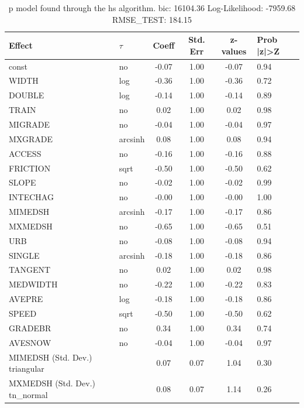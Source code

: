 \begin{table}
	\caption{p model found through the hs algorithm. bic: 16104.36 Log-Likelihood: -7959.68 RMSE_TEST: 184.15}
	\begin{center}
		\begin{tabular}{|l|l|c|c|c|l|}
			\hline
			Effect & $\tau$ & Coeff & Std. Err & z-values & Prob |z|>Z \\
			\hline
			const & no & -0.07 & 1.00 & -0.07 & 0.94 \\
			\hline
			WIDTH & log & -0.36 & 1.00 & -0.36 & 0.72 \\
			\hline
			DOUBLE & log & -0.14 & 1.00 & -0.14 & 0.89 \\
			\hline
			TRAIN & no & 0.02 & 1.00 & 0.02 & 0.98 \\
			\hline
			MIGRADE & no & -0.04 & 1.00 & -0.04 & 0.97 \\
			\hline
			MXGRADE & arcsinh & 0.08 & 1.00 & 0.08 & 0.94 \\
			\hline
			ACCESS & no & -0.16 & 1.00 & -0.16 & 0.88 \\
			\hline
			FRICTION & sqrt & -0.50 & 1.00 & -0.50 & 0.62 \\
			\hline
			SLOPE & no & -0.02 & 1.00 & -0.02 & 0.99 \\
			\hline
			INTECHAG & no & -0.00 & 1.00 & -0.00 & 1.00 \\
			\hline
			MIMEDSH & arcsinh & -0.17 & 1.00 & -0.17 & 0.86 \\
			\hline
			MXMEDSH & no & -0.65 & 1.00 & -0.65 & 0.51 \\
			\hline
			URB & no & -0.08 & 1.00 & -0.08 & 0.94 \\
			\hline
			SINGLE & arcsinh & -0.18 & 1.00 & -0.18 & 0.86 \\
			\hline
			TANGENT & no & 0.02 & 1.00 & 0.02 & 0.98 \\
			\hline
			MEDWIDTH & no & -0.22 & 1.00 & -0.22 & 0.83 \\
			\hline
			AVEPRE & log & -0.18 & 1.00 & -0.18 & 0.86 \\
			\hline
			SPEED & sqrt & -0.50 & 1.00 & -0.50 & 0.62 \\
			\hline
			GRADEBR & no & 0.34 & 1.00 & 0.34 & 0.74 \\
			\hline
			AVESNOW & no & -0.04 & 1.00 & -0.04 & 0.97 \\
			\hline
			MIMEDSH (Std. Dev.) triangular &  & 0.07 & 0.07 & 1.04 & 0.30 \\
			\hline
			MXMEDSH (Std. Dev.) tn_normal &  & 0.08 & 0.07 & 1.14 & 0.26 \\

\end{tabular}
\end{center}
\end{table}
